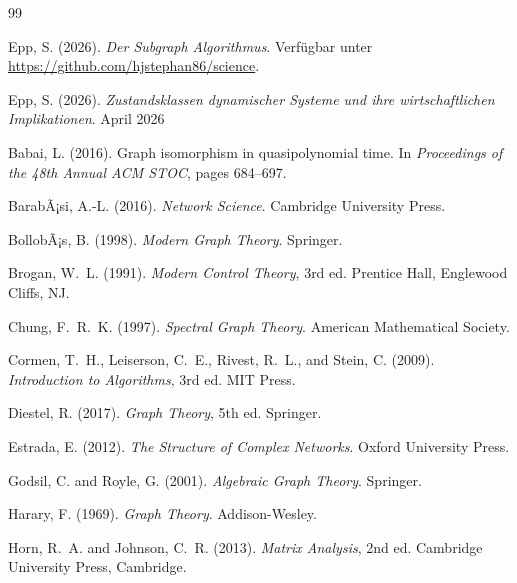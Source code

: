 ﻿\documentclass[12pt, a4paper]{article}
\theoremstyle{definition}
\theoremstyle{remark}
\begin{document}

\begin{thebibliography}{99}
	
	Epp, S. (2026).
	\newblock \textit{Der Subgraph Algorithmus}. Verfügbar unter
	\url{https://github.com/hjstephan86/science}.
	
	Epp, S. (2026).
	\newblock \textit{Zustandsklassen dynamischer Systeme und ihre wirtschaftlichen
		Implikationen}. April 2026
	
	Babai, L. (2016).
	\newblock Graph isomorphism in quasipolynomial time.
	\newblock In \textit{Proceedings of the 48th Annual ACM STOC}, pages 684--697.
	
	BarabÃ¡si, A.-L. (2016).
	\newblock \textit{Network Science}.
	\newblock Cambridge University Press.
	
	BollobÃ¡s, B. (1998).
	\newblock \textit{Modern Graph Theory}.
	\newblock Springer.
	
	Brogan, W.~L. (1991).
	\newblock \textit{Modern Control Theory}, 3rd ed.
	\newblock Prentice Hall, Englewood Cliffs, NJ.
	
	Chung, F.~R.~K. (1997).
	\newblock \textit{Spectral Graph Theory}.
	\newblock American Mathematical Society.
	
	Cormen, T.~H., Leiserson, C.~E., Rivest, R.~L., and Stein, C. (2009).
	\newblock \textit{Introduction to Algorithms}, 3rd ed.
	\newblock MIT Press.
	
	Diestel, R. (2017).
	\newblock \textit{Graph Theory}, 5th ed.
	\newblock Springer.
	
	Estrada, E. (2012).
	\newblock \textit{The Structure of Complex Networks}.
	\newblock Oxford University Press.
	
	Godsil, C. and Royle, G. (2001).
	\newblock \textit{Algebraic Graph Theory}.
	\newblock Springer.
	
	Harary, F. (1969).
	\newblock \textit{Graph Theory}.
	\newblock Addison-Wesley.
	
	Horn, R.~A. and Johnson, C.~R. (2013).
	\newblock \textit{Matrix Analysis}, 2nd ed.
	\newblock Cambridge University Press, Cambridge.
	

\end{thebibliography}
\end{document}
